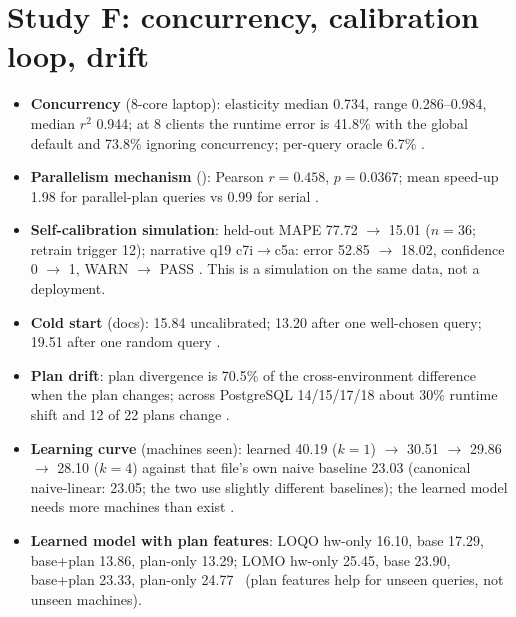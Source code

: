 \section{Study F: concurrency, calibration loop, drift}
\begin{itemize}
\item \textbf{Concurrency} (8-core laptop): elasticity median 0.734, range 0.286--0.984, median $r^2$ 0.944; at 8 clients the runtime error is 41.8\% with the global default and 73.8\% ignoring concurrency; per-query oracle 6.7\% \evFILE.
\item \textbf{Parallelism mechanism} (): Pearson $r=0.458$, $p=0.0367$; mean speed-up 1.98 for parallel-plan queries vs 0.99 for serial \evFILE.
\item \textbf{Self-calibration simulation}: held-out MAPE 77.72 $\to$ 15.01 ($n{=}36$; retrain trigger 12); narrative q19 c7i$\to$c5a: error 52.85 $\to$ 18.02, confidence 0 $\to$ 1, WARN $\to$ PASS \evFILE. This is a simulation on the same data, not a deployment.
\item \textbf{Cold start} (docs): 15.84 uncalibrated; 13.20 after one well-chosen query; 19.51 after one random query \evCLAIM.
\item \textbf{Plan drift}: plan divergence is 70.5\% of the cross-environment difference when the plan changes; across PostgreSQL 14/15/17/18 about 30\% runtime shift and 12 of 22 plans change \evPACK.
\item \textbf{Learning curve} (machines seen): learned 40.19 ($k{=}1$) $\to$ 30.51 $\to$ 29.86 $\to$ 28.10 ($k{=}4$) against that file's own naive baseline 23.03 (canonical naive-linear: 23.05; the two use slightly different baselines); the learned model needs more machines than exist \evFILE.
\item \textbf{Learned model with plan features}: LOQO hw-only 16.10, base 17.29, base+plan 13.86, plan-only 13.29; LOMO hw-only 25.45, base 23.90, base+plan 23.33, plan-only 24.77 \evFILE\ (plan features help for unseen queries, not unseen machines).
\end{itemize}

